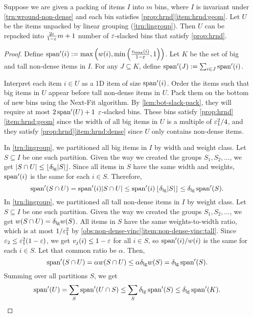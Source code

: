 \begin{lemma}
\label{thm:lg-repack}
Suppose we are given a packing of items $I$ into $m$ bins,
where $I$ is invariant under \cref{trn:wround-non-dense} and
each bin satisfies \cref{prop:hrnd}\ref{item:hrnd:geom}.
Let $U$ be the items unpacked by linear grouping (\cref{trn:lingroup}).
Then $U$ can be repacked into $\frac{2\varepsilon}{1-\varepsilon}m + 1$ number of
$\varepsilon$-slacked bins that satisfy \cref{prop:hrnd}.
\end{lemma}
\begin{proof}
Define $\operatorname{span}'(i) := \max\left(w(i), \min\left(\frac{v_{\max}(i)}{1-\varepsilon}, 1\right)\right)$.
Let $K$ be the set of big and tall non-dense items in $I$.
For any $J \subseteq K$, define $\operatorname{span}'(J) := \sum_{i \in J} \operatorname{span}'(i)$.

Interpret each item $i \in U$ as a 1D item of size $\operatorname{span}'(i)$.
Order the items such that big items in $U$ appear before tall non-dense items in $U$.
Pack them on the bottom of new bins using the Next-Fit algorithm.
By \cref{lem:bot-slack-pack}, they will require at most $2\operatorname{span}'(U) + 1$ $\varepsilon$-slacked bins.
These bins satisfy \cref{prop:hrnd}\ref{item:hrnd:geom}
since the width of all big items in $U$ is a multiple of $\varepsilon_1^2/4$,
and they satisfy \cref{prop:hrnd}\ref{item:hrnd:dense} since $U$
only contains non-dense items.

In \cref{trn:lingroup}, we partitioned all big items in $I$ by width and weight class.
Let $S \subseteq I$ be one such partition.
Given the way we created the groups $S_1, S_2, \ldots$, we get
$|S \cap U| \le \left\lfloor \delta_{\mathrm{lg}}|S| \right\rfloor$.
Since all items in $S$ have the same width and weights,
$\operatorname{span}'(i)$ is the same for each $i \in S$. Therefore,
\[ \operatorname{span}'(S \cap U) = \operatorname{span}'(i)|S \cap U|
\le \operatorname{span}'(i)\left\lfloor \delta_{\mathrm{lg}} |S| \right\rfloor
\le \delta_{\mathrm{lg}} \operatorname{span}'(S). \]
%
In \cref{trn:lingroup}, we partitioned all tall non-dense items in $I$ by weight class.
Let $S \subseteq I$ be one such partition.
Given the way we created the groups $S_1, S_2, \ldots$, we get $w(S \cap U) = \delta_{\mathrm{lg}} w(S)$.
All items in $S$ have the same weights-to-width ratio,
which is at most $1/\varepsilon_1^2$ by \cref{obs:non-dense-vinc}\ref{item:non-dense-vinc:tall}.
Since $\varepsilon_2 \le \varepsilon_1^2(1-\varepsilon)$,
we get $v_j(i) \le 1-\varepsilon$ for all $i \in S$,
so $\operatorname{span}'(i)/w(i)$ is the same for each $i \in S$.
Let that common ratio be $\alpha$. Then,
\[ \operatorname{span}'(S \cap U) = \alpha w(S \cap U)
\le \alpha \delta_{\mathrm{lg}} w(S) = \delta_{\mathrm{lg}} \operatorname{span}'(S). \]
Summing over all partitions $S$, we get
\begin{equation}
\label{eqn:unpacked-vs-packed}
\operatorname{span}'(U) = \sum_S \operatorname{span}'(U \cap S) \le \sum_S \delta_{\mathrm{lg}} \operatorname{span}'(S)
    \le \delta_{\mathrm{lg}} \operatorname{span}'(K).
\end{equation}


\end{proof}
